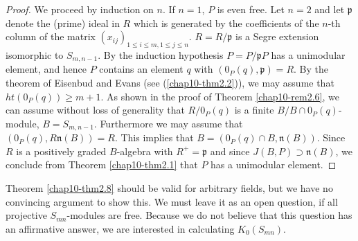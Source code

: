 \begin{proof}
We proceed by induction on $n$. If $n=1$, $P$ is even free. Let $n=2$
and let $\mathfrak{p}$ denote the (prime) ideal in $R$ which is
generated by the coefficients of the $n$-th column of the matrix
$(x_{ij})_{1\leq i\leq m,1\leq j\leq n}$. $R=R/\mathfrak{p}$ is a
Segre extension isomorphic to $S_{m,n-1}$. By the induction hypothesis
$P=P/\mathfrak{p}P$ has a unimodular element, and hence $P$ contains
an element $q$ with $(0_{P}(q),\mathfrak{p})=R$. By the theorem of
Eisenbud and Evans (see (\ref{chap10-thm2.2})), we may assume that
$ht(0_{P}(q))\geq m+1$. As shown in the proof of
Theorem \ref{chap10-rem2.6}, we can assume without loss of generality
that $R/0_{P}(q)$ is a finite $B/B\cap 0_{P}(q)$-module,
$B=S_{m,n-1}$. Furthermore we may assume that
$(0_{P}(q),R\mathfrak{n}(B))=R$. This implies that $B=(0_{P}(q)\cap
B,\mathfrak{n}(B))$. Since $R$ is a positively graded $B$-algebra with
$R^{+}=\mathfrak{p}$ and since $J(B,P)\supset \mathfrak{n}(B)$, we
conclude from Theorem \ref{chap10-thm2.1} that $P$ has a unimodular
element. 
\end{proof}

\begin{subremarks}\label{chap10-rems2.9}
Theorem \ref{chap10-thm2.8} should be valid for arbitrary fields, but
we have no convincing argument to show this. We must leave it as an
open question, if all projective $S_{mn}$-modules are free. Because we
do not believe that this question has an affirmative answer, we are
interested in calculating $K_{0}(S_{mn})$. 
\end{subremarks}


